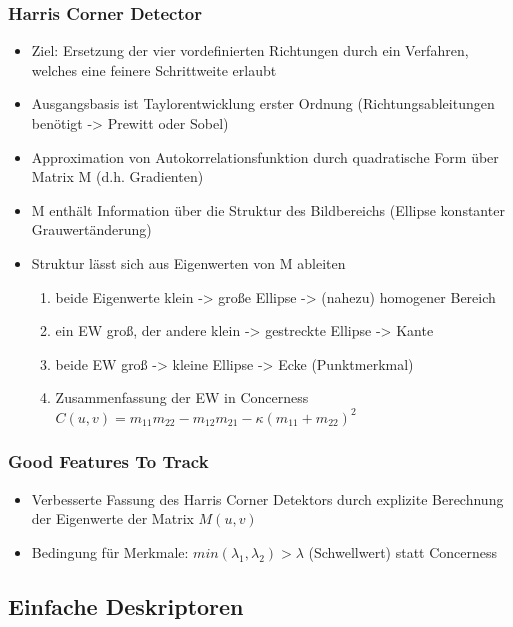 \documentclass[paper=a4, fontsize=11pt]{scrartcl} %
\numberwithin{equation}{section} %
\numberwithin{figure}{section} %
\numberwithin{table}{section} %
\begin{document}
\subsubsection{Harris Corner Detector}

\begin{itemize}
\item Ziel: Ersetzung der vier vordefinierten Richtungen durch ein Verfahren, welches eine feinere Schrittweite erlaubt
\item Ausgangsbasis ist Taylorentwicklung erster Ordnung (Richtungsableitungen benötigt -> Prewitt oder Sobel)
\item Approximation von Autokorrelationsfunktion durch quadratische Form über Matrix M (d.h. Gradienten)
\item M enthält Information über die Struktur des Bildbereichs (Ellipse konstanter Grauwertänderung)
\item Struktur lässt sich aus Eigenwerten von M ableiten
\begin{enumerate}
\item beide Eigenwerte klein -> große Ellipse -> (nahezu) homogener Bereich
\item ein EW groß, der andere klein -> gestreckte Ellipse -> Kante
\item beide EW groß -> kleine Ellipse -> Ecke (Punktmerkmal)
\item Zusammenfassung der EW in Concerness $C(u,v) = m_{11} m_{22} - m_{12} m_{21} - \kappa(m_{11}+m_{22})^2$
\end{enumerate}
\end{itemize}

\subsubsection{Good Features To Track}

\begin{itemize}
\item Verbesserte Fassung des Harris Corner Detektors durch explizite Berechnung der Eigenwerte der Matrix $M(u,v)$
\item Bedingung für Merkmale: $min(\lambda_1,\lambda_2) > \lambda$ (Schwellwert) statt Concerness
\end{itemize}

\subsection{Einfache Deskriptoren}
\end{document}
